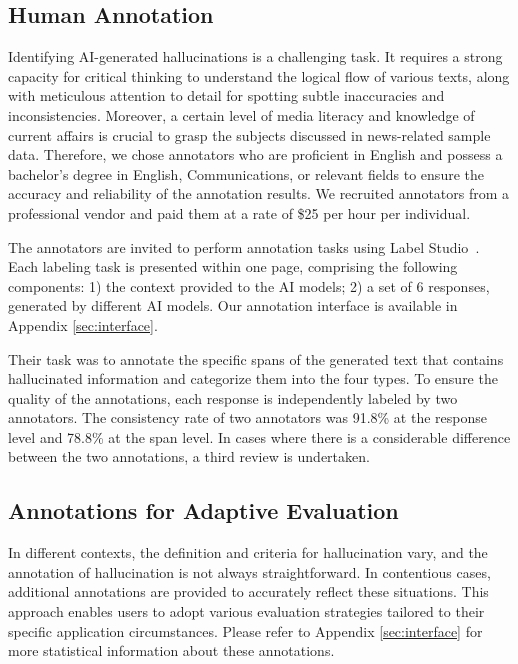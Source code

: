 \documentclass[11pt]{article}
\begin{document}
\subsection{Human Annotation}

Identifying AI-generated hallucinations is a challenging task. It requires a strong capacity for critical thinking to understand the logical flow of various texts, along with meticulous attention to detail for spotting subtle inaccuracies and inconsistencies. 
Moreover, a certain level of media literacy and knowledge of current affairs is crucial to grasp the subjects discussed in news-related sample data. 
Therefore, we chose annotators who are proficient in English and possess a bachelor's degree in English, Communications, or relevant fields to ensure the accuracy and reliability of the annotation results. We recruited annotators from a professional vendor and paid them at a rate of \$25 per hour per individual.

The annotators are invited to perform annotation tasks using Label Studio~\cite{labelstudio2023}. Each labeling task is presented within one page, comprising the following components: 1) the context provided to the AI models; 2) a set of 6 responses, generated by different AI models. Our annotation interface is available in Appendix \ref{sec:interface}.

Their task was to annotate the specific spans of the generated text that contains hallucinated information and categorize them into the four types.
To ensure the quality of the annotations, each response is independently labeled by two annotators. 
The consistency rate of two annotators was 91.8\% at the response level and 78.8\% at the span level.
In cases where there is a considerable difference between the two annotations, a third review is undertaken. 

\subsection{Annotations for Adaptive Evaluation}
In different contexts, the definition and criteria for hallucination vary, and the annotation of hallucination is not always straightforward. In contentious cases, additional annotations are provided to accurately reflect these situations. This approach enables users to adopt various evaluation strategies tailored to their specific application circumstances. Please refer to Appendix \ref{sec:interface} for more statistical information about these annotations.
\end{document}
